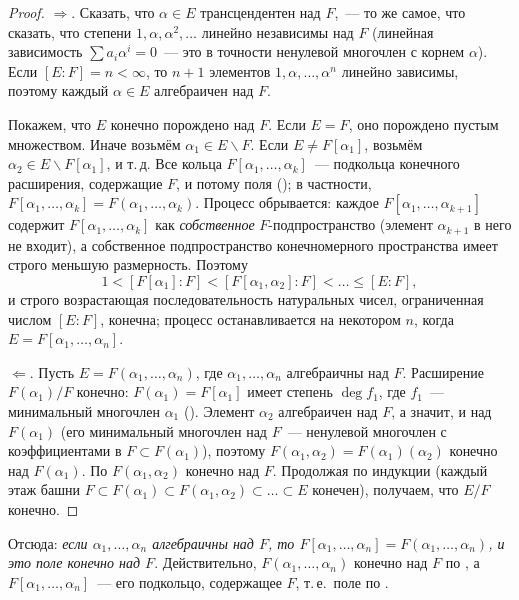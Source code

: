\begin{proof}
$\Rightarrow$. Сказать, что $\alpha\in E$ трансцендентен над $F$,~--- то же самое, что сказать, что степени
$1,\alpha,\alpha^2,\dots$ линейно независимы над $F$ (линейная зависимость $\sum a_i\alpha^i=0$~--- это в точности
ненулевой многочлен с корнем $\alpha$). Если $[E:F]=n<\infty$, то $n+1$ элементов $1,\alpha,\dots,\alpha^n$ линейно
зависимы, поэтому каждый $\alpha\in E$ алгебраичен над $F$.

Покажем, что $E$ конечно порождено над $F$. Если $E=F$, оно порождено пустым множеством. Иначе возьмём
$\alpha_1\in E\smallsetminus F$. Если $E\ne F[\alpha_1]$, возьмём $\alpha_2\in E\smallsetminus F[\alpha_1]$, и т.\,д. Все
кольца $F[\alpha_1,\dots,\alpha_k]$~--- подкольца конечного расширения, содержащие $F$, и потому поля (); в
частности, $F[\alpha_1,\dots,\alpha_k]=F(\alpha_1,\dots,\alpha_k)$. Процесс обрывается: каждое
$F[\alpha_1,\dots,\alpha_{k+1}]$ содержит $F[\alpha_1,\dots,\alpha_k]$ как \emph{собственное} $F$-подпространство
(элемент $\alpha_{k+1}$ в него не входит), а собственное подпространство конечномерного пространства имеет строго
меньшую размерность. Поэтому
\[
1<[F[\alpha_1]:F]<[F[\alpha_1,\alpha_2]:F]<\dots\le[E:F],
\]
и строго возрастающая последовательность натуральных чисел, ограниченная числом $[E:F]$, конечна; процесс
останавливается на некотором $n$, когда $E=F[\alpha_1,\dots,\alpha_n]$.

$\Leftarrow$. Пусть $E=F(\alpha_1,\dots,\alpha_n)$, где $\alpha_1,\dots,\alpha_n$ алгебраичны над $F$. Расширение
$F(\alpha_1)/F$ конечно: $F(\alpha_1)=F[\alpha_1]$ имеет степень $\deg f_1$, где $f_1$~--- минимальный многочлен $\alpha_1$
(). Элемент $\alpha_2$ алгебраичен над $F$, а значит, и над $F(\alpha_1)$ (его минимальный многочлен над $F$~---
ненулевой многочлен с коэффициентами в $F\subset F(\alpha_1)$), поэтому
$F(\alpha_1,\alpha_2)=F(\alpha_1)(\alpha_2)$ конечно над $F(\alpha_1)$. По  $F(\alpha_1,\alpha_2)$ конечно над $F$.
Продолжая по индукции (каждый этаж башни $F\subset F(\alpha_1)\subset F(\alpha_1,\alpha_2)\subset\dots\subset E$ конечен),
получаем, что $E/F$ конечно.
\end{proof}

Отсюда: \emph{если $\alpha_1,\dots,\alpha_n$ алгебраичны над $F$, то $F[\alpha_1,\dots,\alpha_n]=F(\alpha_1,\dots,\alpha_n)$, и
это поле конечно над $F$}. Действительно, $F(\alpha_1,\dots,\alpha_n)$ конечно над $F$ по , а
$F[\alpha_1,\dots,\alpha_n]$~--- его подкольцо, содержащее $F$, т.\,е.\ поле по .

